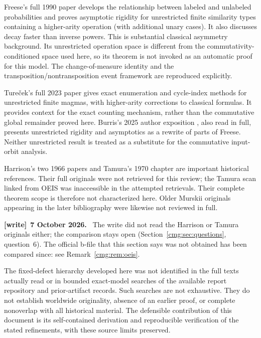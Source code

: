 \documentclass[11pt,letterpaper]{article}
\numberwithin{equation}{section}
\theoremstyle{definition}\newtheorem{definition}[theorem]{Definition}
\theoremstyle{remark}\newtheorem{remark}[theorem]{Remark}
\newenvironment{writenote}[1][]{\par\smallskip\begingroup\small
 \noindent\textbf{[write]}\if\relax\detokenize{#1}\relax\else~\textbf{#1.}\fi\ }%
 {\par\endgroup\smallskip}
\begin{document}
Freese's full 1990 paper \cite{freese} develops the relationship between labeled and unlabeled probabilities and proves asymptotic rigidity for unrestricted finite similarity types containing a higher-arity operation (with additional unary cases). It also discusses decay faster than inverse powers. This is substantial classical asymmetry background. Its unrestricted operation space is different from the commutativity-conditioned space used here, so its theorem is not invoked as an automatic proof for this model. The change-of-measure identity and the transposition/nontransposition event framework are reproduced explicitly.

Ture\v cek's full 2023 paper \cite{turecek} gives exact enumeration and cycle-index methods for unrestricted finite magmas, with higher-arity corrections to classical formulas. It provides context for the exact counting mechanism, rather than the commutative global remainder proved here. Burris's 2025 author exposition \cite{burris}, also read in full, presents unrestricted rigidity and asymptotics as a rewrite of parts of Freese. Neither unrestricted result is treated as a substitute for the commutative input-orbit analysis.

Harrison's two 1966 papers \cite{harrison,harrison-note} and Tamura's 1970 chapter \cite{tamura} are important historical references. Their full originals were not retrieved for this review; the Tamura scan linked from OEIS was inaccessible in the attempted retrievals. Their complete theorem scope is therefore not characterized here. Older Murskii originals appearing in the later bibliography were likewise not reviewed in full.
\begin{writenote}[7 October 2026]
The write did not read the Harrison or Tamura originals either; the comparison
stays open (Section~\ref{cmg:sec:questions}, question~6). The official b-file
that this section says was not obtained has been compared since: see
Remark~\ref{cmg:rem:oeis}.
\end{writenote}

The fixed-defect hierarchy developed here was not identified in the full texts actually read or in bounded exact-model searches of the available report repository and prior-artifact records. Such searches are not exhaustive. They do not establish worldwide originality, absence of an earlier proof, or complete nonoverlap with all historical material. The defensible contribution of this document is its self-contained derivation and reproducible verification of the stated refinements, with these source limits preserved.
\end{document}
